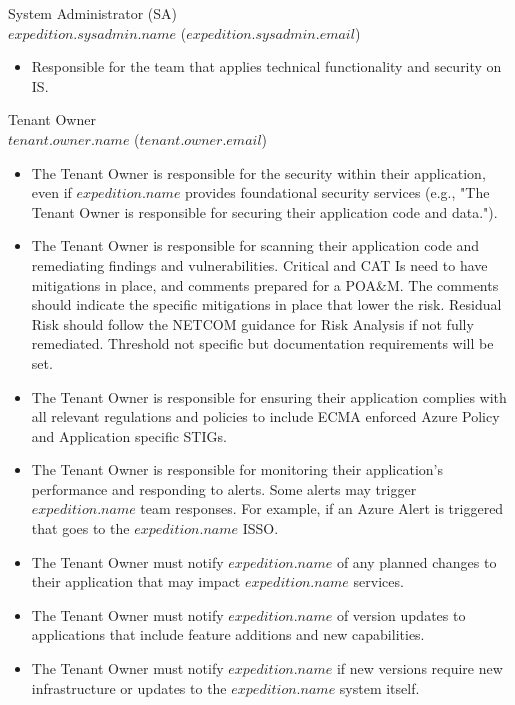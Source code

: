 \documentclass[11pt]{article}
\begin{document}
    System Administrator (SA) \\
    $expedition.sysadmin.name$ ($expedition.sysadmin.email$)
    \begin{itemize}
      \item Responsible for the team that applies technical functionality and security on IS. 
    \end{itemize}
    Tenant Owner \\
    $tenant.owner.name$ ($tenant.owner.email$)
    \begin{itemize}
      \item The Tenant Owner is responsible for the security within their application, even if $expedition.name$ provides foundational security services (e.g., "The Tenant Owner is responsible for securing their application code and data.").
      \item The Tenant Owner is responsible for scanning their application code and remediating findings and vulnerabilities. Critical and CAT Is need to have mitigations in place, and comments prepared for a POA\&M. The comments should indicate the specific mitigations in place that lower the risk. Residual Risk should follow the NETCOM guidance for Risk Analysis if not fully remediated. Threshold not specific but documentation requirements will be set. 
      \item The Tenant Owner is responsible for ensuring their application complies with all relevant regulations and policies to include ECMA enforced Azure Policy and Application specific STIGs.
      \item The Tenant Owner is responsible for monitoring their application's performance and responding to alerts. Some alerts may trigger $expedition.name$ team responses. For example, if an Azure Alert is triggered that goes to the $expedition.name$ ISSO.
      \item The Tenant Owner must notify $expedition.name$ of any planned changes to their application that may impact $expedition.name$ services. 
      \item The Tenant Owner must notify $expedition.name$ of version updates to applications that include feature additions and new capabilities.
      \item The Tenant Owner must notify $expedition.name$ if new versions require new infrastructure or updates to the $expedition.name$ system itself.
    \end{itemize}
    
  \newpage
\end{document}
